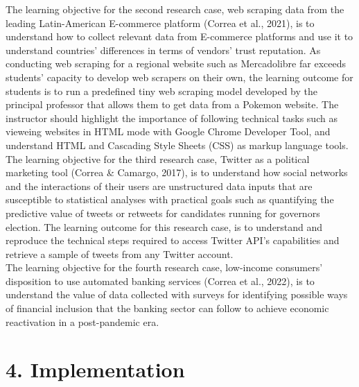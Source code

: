 \documentclass[letterpaper,11pt]{article}
\begin{document}
The learning objective for the second research case, web scraping data from the leading Latin-American E-commerce platform (Correa et al., 2021), is to understand how to collect relevant data from E-commerce platforms and use it to understand countries' differences in terms of vendors' trust reputation. As conducting web scraping for a regional website such as Mercadolibre far exceeds students' capacity to develop web scrapers on their own, the learning outcome for students is to run a predefined tiny web scraping model developed by the principal professor that allows them to get data from a Pokemon website. The instructor should highlight the importance of following technical tasks such as vieweing websites in HTML mode with Google Chrome Developer Tool, and understand HTML and Cascading Style Sheets (CSS) as markup language tools.\\
\vspace{0.3cm}
The learning objective for the third research case, Twitter as a political marketing tool (Correa \& Camargo, 2017), is to understand how social networks and the interactions of their users are unstructured data inputs that are susceptible to statistical analyses with practical goals such as quantifying the predictive value of tweets or retweets for candidates running for governors election. The learning outcome for this research case, is to understand and reproduce the technical steps required to access Twitter API's capabilities and retrieve a sample of tweets from any Twitter account.\\
\vspace{0.3cm}
The learning objective for the fourth research case, low-income consumers’ disposition to use automated banking services (Correa et al., 2022), is to understand the value of data collected with surveys for identifying possible ways of financial inclusion that the banking sector can follow to achieve economic reactivation in a post-pandemic era.



\section{4. Implementation}
\end{document}
